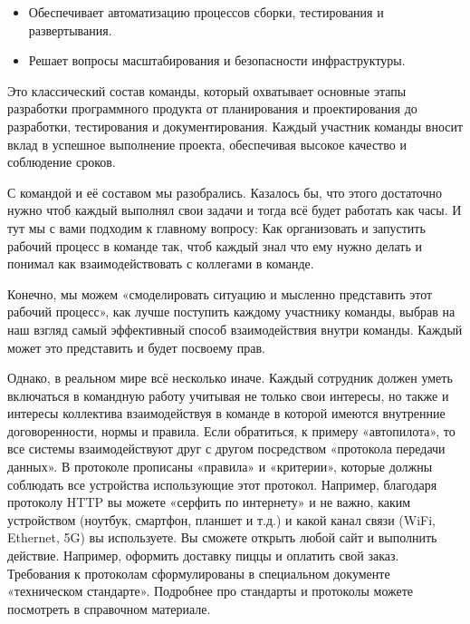\documentclass[letterpaper,10pt,russian]{sphinxmanual}
\begin{document}
\begin{enumerate}
\begin{itemize}
\item {} 
\sphinxAtStartPar
Обеспечивает автоматизацию процессов сборки, тестирования и развертывания.

\item {} 
\sphinxAtStartPar
Решает вопросы масштабирования и безопасности инфраструктуры.

\end{itemize}

\end{enumerate}

\sphinxAtStartPar
Это классический состав команды, который охватывает основные этапы разработки программного продукта \textendash{} от планирования и проектирования до разработки, тестирования и документирования. Каждый участник команды вносит вклад в успешное выполнение проекта, обеспечивая высокое качество и соблюдение сроков.

\sphinxAtStartPar
С командой и её составом мы разобрались. Казалось бы, что этого достаточно \sphinxhyphen{} нужно чтоб каждый выполнял свои задачи и тогда всё будет работать как часы. И тут мы с вами подходим к главному вопросу: Как организовать и запустить рабочий процесс в команде так, чтоб каждый знал что ему нужно делать и понимал как взаимодействовать с коллегами в команде.

\sphinxAtStartPar
Конечно, мы можем «смоделировать ситуацию и мысленно представить этот рабочий процесс», как лучше поступить каждому участнику команды, выбрав на наш взгляд самый эффективный способ взаимодействия внутри команды. Каждый может это представить и будет по\sphinxhyphen{}своему прав.

\sphinxAtStartPar
Однако, в реальном мире всё несколько иначе. Каждый сотрудник должен уметь включаться в командную работу учитывая не только свои интересы, но также и интересы коллектива взаимодействуя в команде в которой имеются внутренние договоренности, нормы и правила. Если обратиться, к примеру «автопилота», то все системы взаимодействуют друг с другом посредством «протокола передачи данных». В протоколе прописаны «правила» и «критерии», которые должны соблюдать все устройства использующие этот протокол. Например, благодаря протоколу HTTP вы можете «серфить по интернету» и не важно, каким устройством (ноутбук, смартфон, планшет и т.д.) и какой канал связи (WiFi, Ethernet, 5G) вы используете. Вы сможете открыть любой сайт и выполнить действие. Например, оформить доставку пиццы и оплатить свой заказ. Требования к протоколам сформулированы в специальном документе \sphinxhyphen{} «техническом стандарте». Подробнее про стандарты и протоколы можете посмотреть в справочном материале.
\end{document}
